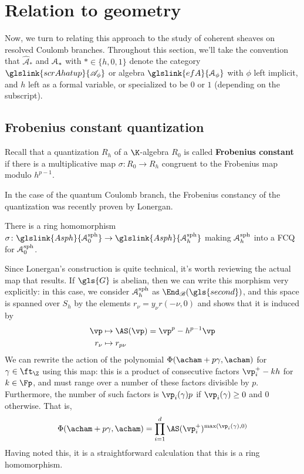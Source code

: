 \section{Relation to geometry}
\label{sec:geometry}
Now, we turn to relating this approach to the study of coherent
sheaves on resolved Coulomb branches.   Throughout this section, we'll
take the convention that $\widehat{\mathscr{A}}_*$
and $\EuScript{A}_*$ with $*\in \{h,0,1\}$ denote the category $\glslink{scrAhatup}{\mathscr{A}_\phi}$ or algebra
$\glslink{efA}{\EuScript{A}_\phi}$ with $\phi$ left implicit, and $h$ left as a formal variable, or specialized to
be $0$ or $1$ (depending on the subscript).  

\subsection{Frobenius constant quantization}

Recall that a quantization $R_h$ of a $\K$-algebra $R_0$ is called {\bf Frobenius
  constant} if there is a multiplicative map $\sigma\colon
R_0\to R_h$ congruent to the Frobenius map
modulo $h^{p-1}$.  

In the case of the quantum Coulomb branch, the Frobenius constancy of the quantization was recently proven by Lonergan.
\begin{theorem}
  There is a ring homomorphism $\sigma\colon \glslink{Asph}{\EuScript{A}_0^{\operatorname{sph}}}\to  \glslink{Asph}{\EuScript{A}_h^{\operatorname{sph}}}$
  making $\EuScript{A}_h^{\operatorname{sph}}$ into a FCQ for $\EuScript{A}_0^{\operatorname{sph}}$.
\end{theorem}
Since Lonergan's construction is quite technical, it's worth reviewing the actual map that results.    If $\gls{G}$ is abelian, then we can write this morphism very explicitly:  in this case, we consider $\EuScript{A}_h^{\operatorname{sph}}$ as $\End_{\mathscr{B}}(\gls{second})$, and this space is spanned over $S_h$ by the elements $r_\nu=y_{\nu}r(-\nu,0)$ and \cite[\S 3.15(3)]{Lon} shows that
  it is induced by 
\begin{align}
    \vp &\mapsto \AS(\vp)=\vp^p-h^{p-1}\vp\\
     r_\nu&\mapsto r_{p\nu}
\end{align} 
We can rewrite the action of the polynomial
$\Phi(\acham+p\gamma,\acham)$ for $\gamma\in \ft_{\Z}$ using this map:
this is a product of consecutive factors $\vp_i^+-kh$ for $k\in \Fp$,
and must range over a number of these factors divisible by $p$.
Furthermore, the number of such factors is $\vp_i(\gamma)p$ if
$\vp_i(\gamma)\geq 0$ and $0$ otherwise.  That
is,
\[\Phi(\acham+p\gamma,\acham)=\prod_{i=1}^d
\AS(\vp^+_i)^{\operatorname{max}(\vp_i(\gamma),0)}\]
Having noted this, it is a
straightforward calculation that this is a ring homomorphism.

